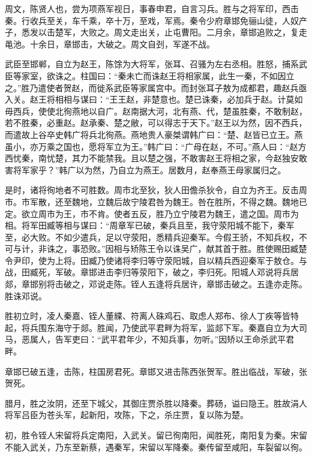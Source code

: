 \documentclass[12pt,UTF8]{ctexbook}
\begin{document}
周文，陈贤人也，尝为项燕军视日，事春申君，自言习兵。胜与之将军印，西击秦。行收兵至关，车千乘，卒十万，至戏，军焉。秦令少府章邯免骊山徒，人奴产子，悉发以击楚军，大败之。周文走出关，止屯曹阳。二月余，章邯追败之，复走黾池。十余日，章邯击，大破之。周文自刭，军遂不战。



武臣至邯郸，自立为赵王，陈馀为大将军，张耳、召骚为左右丞相。胜怒，捕系武臣等家室，欲诛之。柱国曰：“秦未亡而诛赵王将相家属，此生一秦，不如因立之。”胜乃遣使者贺赵，而徙系武臣等家属宫中。而封张耳子敖为成都君，趣赵兵亟入关。赵王将相相与谋曰：“王王赵，非楚意也。楚已诛秦，必加兵于赵。计莫如毋西兵，使使北徇燕地以自广。赵南据大河，北有燕、代，楚虽胜秦，不敢制赵，若不胜秦，必重赵。赵承秦、楚之敝，可以得志于天下。”赵王以为然，因不西兵，而遣故上谷卒史韩广将兵北徇燕。燕地贵人豪桀谓韩广曰：“楚、赵皆已立王。燕虽小，亦万乘之国也，愿将军立为王。”韩广曰：“广母在赵，不可。”燕人曰：“赵方西忧秦，南忧楚，其力不能禁我。且以楚之强，不敢害赵王将相之家，今赵独安敢害将军家乎？”韩广以为然，乃自立为燕王。居数月，赵奉燕王母家属归之。



是时，诸将徇地者不可胜数。周市北至狄，狄人田儋杀狄令，自立为齐王。反击周市。市军散，还至魏地，立魏后故宁陵君咎为魏王。咎在胜所，不得之魏。魏地已定。欲立周市为王，市不肯。使者五反，胜乃立宁陵君为魏王，遣之国。周市为相。将军田臧等相与谋曰：“周章军已破，秦兵且至，我守荥阳城不能下，秦军至，必大败。不如少遣兵，足以守荥阳，悉精兵迎秦军。今假王骄，不知兵权，不可与计，非诛之，事恐败。”因相与矫陈王令以诛吴广，献其首于胜。胜使赐田臧楚令尹印，使为上将。田臧乃使诸将李归等守荥阳城，自以精兵西迎秦军于敖仓。与战，田臧死，军破。章邯进击李归等荥阳下，破之，李归死。阳城人邓说将兵居郯，章邯别将击破之，邓说走陈。铚人五逢将兵居许，章邯击破之。五逢亦走陈。胜诛邓说。



胜初立时，凌人秦嘉、铚人董緤、符离人硃鸡石、取虑人郑布、徐人丁疾等皆特起，将兵围东海守于郯。胜闻，乃使武平君畔为将军，监郯下军。秦嘉自立为大司马，恶属人，告军吏曰：“武平君年少，不知兵事，勿听。”因矫以王命杀武平君畔。



章邯已破五逢，击陈，柱国房君死。章邯又进击陈西张贺军。胜出临战，军破，张贺死。



腊月，胜之汝阴，还至下城父，其御庄贾杀胜以降秦。葬砀，谥曰隐王。胜故涓人将军吕臣为苍头军，起新阳，攻陈，下之，杀庄贾，复以陈为楚。



初，胜令铚人宋留将兵定南阳，入武关。留已徇南阳，闻胜死，南阳复为秦。宋留不能入武关，乃东至新蔡，遇秦军，宋留以军降秦。秦传留至咸阳，车裂留以徇。
\end{document}
